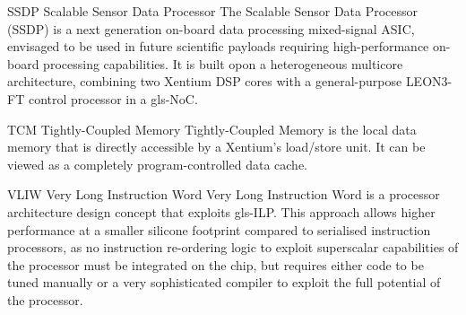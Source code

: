 




  {SSDP}            %
  {Scalable Sensor Data Processor}  %
  {The Scalable Sensor Data Processor (SSDP) is a next generation on-board %
   data processing mixed-signal ASIC, envisaged to be used in future scientific %
   payloads requiring high-performance on-board processing capabilities. %
   It is built opon a heterogeneous multicore architecture, combining two %
   \gls{Xentium} \gls{DSP} cores with a general-purpose \gls{LEON3-FT} control %
   processor in a \gls{gls-NoC}.} %


%
  {TCM}%
  {Tightly-Coupled Memory}%
  {Tightly-Coupled Memory is the local data memory that is directly accessible %
   by a Xentium's load/store unit. It can be viewed as a completely %
   program-controlled data cache.}%




%
  {VLIW}%
  {Very Long Instruction Word}%
  {Very Long Instruction Word is a processor architecture design concept that
   exploits \gls{gls-ILP}. This approach allows higher performance at a smaller
   silicone footprint compared to serialised instruction processors, as no
   instruction re-ordering logic to exploit superscalar capabilities of the
   processor must be integrated on the chip, but requires either code to be
   tuned manually or a very sophisticated compiler to exploit the full potential
   of the processor.}%



\glsresetall
\makeglossaries
